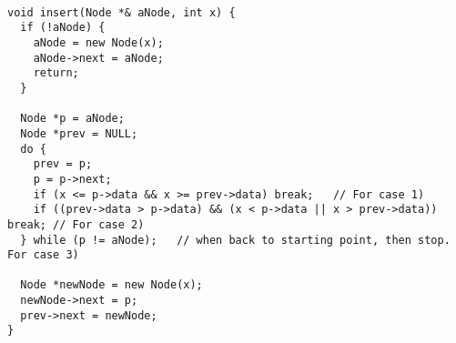 \begin{verbatim}

void insert(Node *& aNode, int x) {
  if (!aNode) {
    aNode = new Node(x);
    aNode->next = aNode;
    return;
  }

  Node *p = aNode;
  Node *prev = NULL;
  do {
    prev = p;
    p = p->next;
    if (x <= p->data && x >= prev->data) break;   // For case 1)
    if ((prev->data > p->data) && (x < p->data || x > prev->data)) break; // For case 2)
  } while (p != aNode);   // when back to starting point, then stop. For case 3)

  Node *newNode = new Node(x);
  newNode->next = p;
  prev->next = newNode;
}

\end{verbatim}

